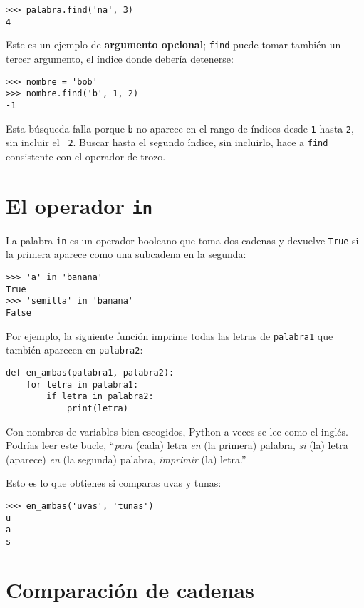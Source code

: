 \documentclass[10pt]{book}
\begin{document}
\begin{verbatim}
>>> palabra.find('na', 3)
4
\end{verbatim}
%
Este es un ejemplo de {\bf argumento opcional};
{\tt find} puede
tomar también un tercer argumento, el índice donde debería detenerse:

\begin{verbatim}
>>> nombre = 'bob'
>>> nombre.find('b', 1, 2)
-1
\end{verbatim}
%
Esta búsqueda falla porque {\tt b} no
aparece en el rango de índices desde {\tt 1} hasta {\tt 2}, sin incluir el {\tt
2}.  Buscar hasta el segundo índice, sin incluirlo, hace a
{\tt find} consistente con el operador de trozo.



\section{El operador {\tt in}}
\label{inboth}

La palabra {\tt in} es un operador booleano que toma dos cadenas y
devuelve {\tt True} si la primera aparece como una subcadena en la segunda:

\begin{verbatim}
>>> 'a' in 'banana'
True
>>> 'semilla' in 'banana'
False
\end{verbatim}
%
Por ejemplo, la siguiente función imprime todas las
letras de {\tt palabra1} que también aparecen en {\tt palabra2}:

\begin{verbatim}
def en_ambas(palabra1, palabra2):
    for letra in palabra1:
        if letra in palabra2:
            print(letra)
\end{verbatim}
%
Con nombres de variables bien escogidos,
Python a veces se lee como el inglés.  Podrías leer
este bucle, ``{\em para} (cada) letra {\em en} (la primera) palabra, {\em si} (la) letra
(aparece) {\em en} (la segunda) palabra, {\em imprimir} (la) letra.''

Esto es lo que obtienes si comparas uvas y tunas:

\begin{verbatim}
>>> en_ambas('uvas', 'tunas')
u
a
s
\end{verbatim}
%

\section{Comparación de cadenas}
\end{document}
